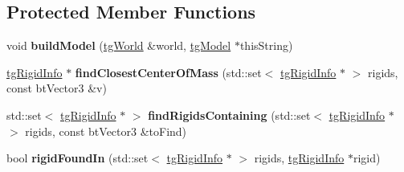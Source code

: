 \subsection*{Protected Member Functions}
\begin{DoxyCompactItemize}
\item 
\hypertarget{classtg_r_b_string_info_a87e35ce7c69d3dc7aa9876780539e7b9}{void {\bfseries build\-Model} (\hyperlink{classtg_world}{tg\-World} \&world, \hyperlink{classtg_model}{tg\-Model} $\ast$this\-String)}\label{classtg_r_b_string_info_a87e35ce7c69d3dc7aa9876780539e7b9}

\item 
\hypertarget{classtg_connector_info_ae4cc2bb42c711b84030de8aa85c62914}{\hyperlink{classtg_rigid_info}{tg\-Rigid\-Info} $\ast$ {\bfseries find\-Closest\-Center\-Of\-Mass} (std\-::set$<$ \hyperlink{classtg_rigid_info}{tg\-Rigid\-Info} $\ast$ $>$ rigids, const bt\-Vector3 \&v)}\label{classtg_connector_info_ae4cc2bb42c711b84030de8aa85c62914}

\item 
\hypertarget{classtg_connector_info_a846dd3e81da5a535df56b1adcf1a22c4}{std\-::set$<$ \hyperlink{classtg_rigid_info}{tg\-Rigid\-Info} $\ast$ $>$ {\bfseries find\-Rigids\-Containing} (std\-::set$<$ \hyperlink{classtg_rigid_info}{tg\-Rigid\-Info} $\ast$ $>$ rigids, const bt\-Vector3 \&to\-Find)}\label{classtg_connector_info_a846dd3e81da5a535df56b1adcf1a22c4}

\item 
\hypertarget{classtg_connector_info_a5c509a7fa18968d5f2cd4e5d85fde970}{bool {\bfseries rigid\-Found\-In} (std\-::set$<$ \hyperlink{classtg_rigid_info}{tg\-Rigid\-Info} $\ast$ $>$ rigids, \hyperlink{classtg_rigid_info}{tg\-Rigid\-Info} $\ast$rigid)}\label{classtg_connector_info_a5c509a7fa18968d5f2cd4e5d85fde970}

\end{DoxyCompactItemize}

